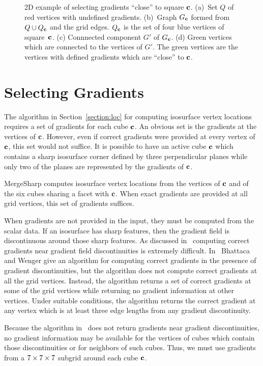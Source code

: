 \begin{figure}[t]
\caption{2D example of selecting gradients ``close'' to square $\mathbf{c}$.
(a)~Set $Q$ of red vertices with undefined gradients.
(b)~Graph $G_{\mathbf{c}}$ formed from $Q \cup Q_{\mathbf{c}}$ and the grid edges.
$Q_{\mathbf{c}}$ is the set of four blue vertices of square~$\mathbf{c}$.
(c) Connnected component $G'$ of $G_{\mathbf{c}}$.
(d) Green vertices which are connected to the vertices of $G'$.
The green vertices are the vertices with defined gradients
which are ``close'' to $\mathbf{c}$.
}
\label{fig:grad_select}
\end{figure}


\section{Selecting Gradients}
\label{section:gradients}

The algorithm in Section~\ref{section:loc}
for computing isosurface vertex locations requires
a set of gradients for each cube $\mathbf{c}$.
An obvious set is the gradients at the vertices of $\mathbf{c}$.
However, even if correct gradients were provided at every vertex of $\mathbf{c}$,
this set would not suffice.
It is possible to have an active cube $\mathbf{c}$
which contains a sharp isosurface corner
defined by three perpendicular planes
while only two of the planes are represented by the gradients of $\mathbf{c}$.

MergeSharp computes isosurface vertex locations 
from the vertices of $\mathbf{c}$ and of the six cubes sharing a facet with $\mathbf{c}$.
When exact gradients are provided at all grid vertices,
this set of gradients suffices.

When gradients are not provided in the input,
they must be computed from the scalar data.
If an isosurface has sharp features,
then the gradient field is discontinuous around those sharp features.
As discussed in~\cite{bw-crgsd-15}
computing correct gradients near gradient field discontinuities
is extremely difficult.
In~\cite{bw-crgsd-15}
Bhattaca and Wenger give an algorithm for computing correct gradients
in the presence of gradient discontinuities, but the algorithm does
not compute correct gradients at all the grid vertices.
Instead, the algorithm returns a set of correct gradients
at some of the grid vertices while returning no gradient information
at other vertices.
Under suitable conditions,
the algorithm returns the correct gradient at any vertex
which is at least three edge lengths from any gradient discontinuity.

Because the algorithm in~\cite{bw-crgsd-15}
does not return gradients near gradient discontinuities,
no gradient information may be available for the vertices 
of cubes which contain those discontinuities
or for neighbors of such cubes.
Thus, we must use gradients from a $7 \times 7 \times 7$ subgrid around each cube $\mathbf{c}$.

